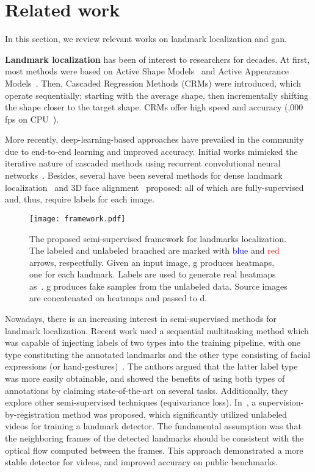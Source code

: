 \documentclass[10pt,twocolumn,letterpaper]{article}
\begin{document}
\section{Related work}
\label{sec:relatedwork}


In this section, we review relevant works on landmark localization and \gls{gan}.

\textbf{Landmark localization} has been of interest to researchers for decades. At first, most methods were based on Active Shape Models~\cite{cootes1992active} and Active Appearance Models~\cite{cootes2001active}. Then, Cascaded Regression Methods (CRMs) were introduced, which operate sequentially; starting with the average shape, then incrementally shifting the shape closer to the target shape. CRMs offer high speed and accuracy (,000 fps on CPU~\cite{ren2014face,kazemi2014one}). 

More recently, deep-learning-based approaches have prevailed in the community due to end-to-end learning and improved accuracy. Initial works mimicked the iterative nature of cascaded methods using recurrent convolutional neural networks~\cite{peng2018red, trigeorgis2016mnemonic,wang2016recurrentaccv,wang2018recurrentpami}. Besides, several have been several methods for dense landmark localization~\cite{guler2017densereg,jeni2015dense} and 3D face alignment~\cite{tulyakov2018consistent, zhu2016face} proposed: all of which are fully-supervised and, thus, require labels for each image. 

\begin{figure*}
    \centering
    \texttt{[image: framework.pdf]}
    \caption{The proposed semi-supervised framework for landmarks localization. The labeled and unlabeled branched are marked with \textcolor{blue}{blue} and \textcolor{red}{red} arrows, respectfully. Given an input image, \gls{g} produces  heatmaps, one for each landmark. Labels are used to generate real heatmaps as~. \gls{g} produces fake samples from the unlabeled data. Source images are concatenated on heatmaps and passed to \gls{d}.}
    \label{fig:framework}
\end{figure*}


Nowadays, there is an increasing interest in semi-supervised methods for landmark localization. Recent work used a sequential multitasking method which was capable of injecting labels of two types into the training pipeline, with one type constituting the annotated landmarks and the other type consisting of facial expressions (or hand-gestures)~\cite{honari2018improving}. The authors argued that the latter label type was more easily obtainable, and showed the benefits of using both types of annotations by claiming state-of-the-art on several tasks. Additionally, they explore other semi-supervised techniques (\eg equivariance loss). In~\cite{dong2018supervision}, a supervision-by-registration method was proposed, which significantly utilized unlabeled videos for training a landmark detector. The fundamental assumption was that the neighboring frames of the detected landmarks should be consistent with the optical flow computed between the frames. This approach demonstrated a more stable detector for videos, and improved accuracy on public benchmarks. 
\end{document}
